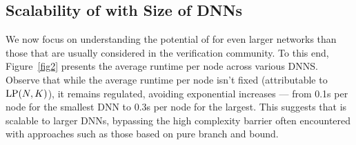 
%
%		
%	



\subsection{Scalability of {\toolname} with Size of DNNs}

We now focus on understanding the potential of {\toolname} for even larger networks than those that are usually considered in the verification community. To this end, Figure~\ref{fig2} presents the  average runtime per node across various DNNS. Observe that while  the average runtime per node isn't fixed (attributable to ${\textrm{LP}}(N,K)$), it remains regulated, avoiding exponential increases — from 0.1s per node for the smallest DNN to 0.3s per node for the largest. This suggests that {\toolname} is scalable to larger DNNs, bypassing the high complexity barrier often encountered with approaches such as those based on pure branch and bound.


